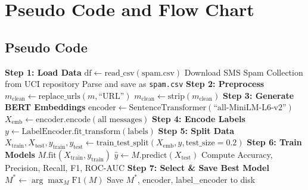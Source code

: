 \documentclass[12pt,a4paper]{article}
\begin{document}
\section{Pseudo Code and Flow Chart}

\subsection{Pseudo Code}

\begin{algorithm}[H]
\caption{BERT Spam Classifier -- Training Pipeline}
\begin{algorithmic}[1]
    \State \textbf{Step 1: Load Data}
        \State $\text{df} \gets \text{read\_csv}(\text{spam.csv})$
    \Else
        \State Download SMS Spam Collection from UCI repository
        \State Parse and save as \texttt{spam.csv}
    \EndIf
    \State
    \State \textbf{Step 2: Preprocess}
        \State $m_{\text{clean}} \gets \text{replace\_urls}(m, \text{``URL''})$
        \State $m_{\text{clean}} \gets \text{strip}(m_{\text{clean}})$
    \EndFor
    \State
    \State \textbf{Step 3: Generate BERT Embeddings}
    \State $\text{encoder} \gets \text{SentenceTransformer}(\text{``all-MiniLM-L6-v2''})$
    \State $X_{\text{emb}} \gets \text{encoder.encode}(\text{all messages})$ 
    \State
    \State \textbf{Step 4: Encode Labels}
    \State $y \gets \text{LabelEncoder.fit\_transform}(\text{labels})$ 
    \State
    \State \textbf{Step 5: Split Data}
    \State $X_{\text{train}}, X_{\text{test}}, y_{\text{train}}, y_{\text{test}} \gets \text{train\_test\_split}(X_{\text{emb}}, y, \text{test\_size}=0.2)$
    \State
    \State \textbf{Step 6: Train Models}
        \State $M.\text{fit}(X_{\text{train}}, y_{\text{train}})$
        \State $\hat{y} \gets M.\text{predict}(X_{\text{test}})$
        \State Compute Accuracy, Precision, Recall, F1, ROC-AUC
    \EndFor
    \State
    \State \textbf{Step 7: Select \& Save Best Model}
    \State $M^{*} \gets \arg\max_{M} \text{F1}(M)$
    \State Save $M^{*}$, encoder, label\_encoder to disk
\EndProcedure
\end{algorithmic}
\end{algorithm}

\vspace{0.5cm}
\end{document}
